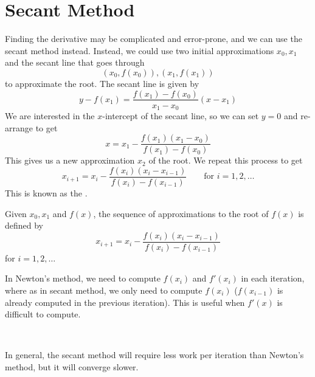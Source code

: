 \section{Secant Method}

Finding the derivative may be complicated and error-prone, and we can use the secant method instead. Instead, we could use two initial approximations \( x_0, x_1 \) and the secant line that goes through \[
    (x_0, f(x_0)), (x_1, f(x_1))
\] to approximate the root. The secant line is given by \[
    y - f(x_1) = \frac{f(x_1) - f(x_0)}{x_1 - x_0} (x - x_1)
\] We are interested in the \(x\)-intercept of the secant line, so we can set \( y = 0 \) and re-arrange to get \[
    x = x_1 - \frac{f(x_1)(x_1 - x_0)}{f(x_1) - f(x_0)}
\] This gives us a new approximation \( x_2 \) of the root. We repeat this process to get \[
    x_{i+1} = x_i - \frac{f(x_i)(x_i - x_{i-1})}{f(x_i) - f(x_{i-1})} \qquad \text{for } i = 1, 2, \dots
\] This is known as the .

\begin{definition}
    Given \( x_0, x_1 \) and \( f(x) \), the sequence of approximations to the root of \( f(x) \) is defined by \[
        x_{i+1} = x_i - \frac{f(x_i)(x_i - x_{i-1})}{f(x_i) - f(x_{i-1})}
    \] for \( i = 1, 2, \dots \)
\end{definition}

\begin{remark}
    In Newton's method, we need to compute \( f(x_i) \) and \( f'(x_i) \) in each iteration, where as in secant method, we only need to compute \( f(x_i) \) (\( f(x_{i-1}) \) is already computed in the previous iteration). This is useful when \( f'(x) \) is difficult to compute.

        {~~~}

    In general, the secant method will require less work per iteration than Newton's method, but it will converge slower.
\end{remark}

